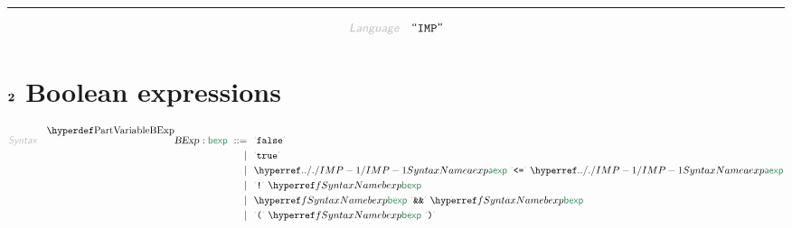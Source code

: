 

\begin{center}
\rule{3in}{0.4pt}
\end{center}

\begin{displaymath}
\KEY{Language} \quad \STRING{IMP}
\end{displaymath}

\section{$\SECT{2}$ Boolean expressions}\hypertarget{sect2-boolean-expressions}{}\label{sect2-boolean-expressions}

\begin{align*}
  \KEY{Syntax} \quad
    \VARDECL{BExp} : \SYN{bexp}
      \ ::= \ & \
      \LEX{false} \\
      \ \mid \ & \ \LEX{true} \\
      \ \mid \ & \ \SYNHYPER{../.}{IMP-1}{aexp} \ \LEX{{<}{=}} \ \SYNHYPER{../.}{IMP-1}{aexp} \\
      \ \mid \ & \ \LEX{{!}} \ \SYNREF{bexp} \\
      \ \mid \ & \ \SYNREF{bexp} \ \LEX{{\AMPERSAND}{\AMPERSAND}} \ \SYNREF{bexp} \\
      \ \mid \ & \ \LEX{{(}} \ \SYNREF{bexp} \ \LEX{{)}}
\end{align*}
